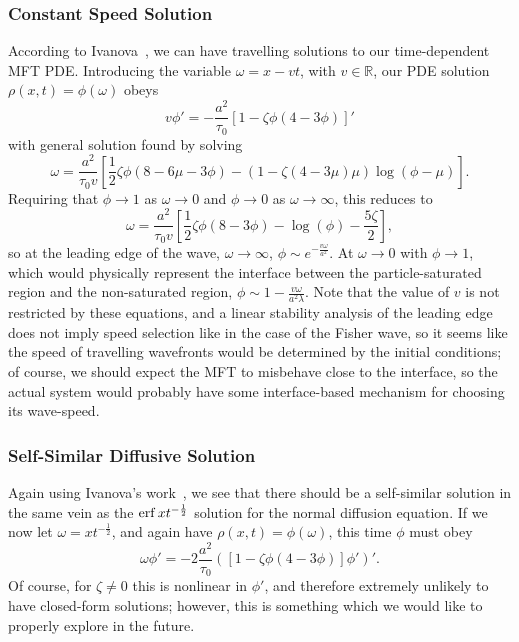 \subsubsection{Constant Speed Solution}
According to Ivanova~\cite{ivanova2007}, we can have travelling solutions to our time-dependent MFT PDE. Introducing the variable $\omega = x - vt$, with $v\in \mathbb{R}$, our PDE solution $\rho(x, t) = \phi(\omega)$ obeys
\begin{equation}
 v \phi ' = -\frac{a^2}{\tau_0} \left[ 1-\zeta \phi \left(4-3\phi\right) \right] '
\end{equation}
with general solution found by solving
\begin{equation}
 \omega = \frac{a^2}{\tau_0 v} \left[ \frac{1}{2} \zeta \phi \left(8-6\mu-3\phi\right) - \left(1-\zeta\left(4-3\mu\right)\mu\right) \log{\left(\phi-\mu\right)} \right].
\end{equation}
Requiring that $\phi \rightarrow  1$ as $\omega \rightarrow 0$ and $\phi \rightarrow 0$ as $\omega \rightarrow \infty$, this reduces to
\begin{equation}
 \omega = \frac{a^2}{\tau_0 v} \left[ \frac{1}{2} \zeta \phi \left(8-3\phi\right) - \log{\left(\phi\right)} - \frac{5 \zeta}{2} \right],
\end{equation}
so at the leading edge of the wave, $\omega \rightarrow \infty$, $\phi \sim e^{-\frac{v \omega}{a^2}} $. At $\omega \rightarrow 0$ with $\phi \rightarrow 1$, which would physically represent the interface between the particle-saturated
region and the non-saturated region, $\phi \sim 1 - \frac{v \omega}{a^2 \lambda}$. Note that the value of $v$ is not restricted by these equations, and a linear stability analysis of the leading edge does not imply speed selection like in
the case of the Fisher wave\cite{sherratt1998transition}, so it seems like the speed of travelling wavefronts would be determined by the initial conditions; of course, we should expect the MFT to misbehave close to the interface,
so the actual system would probably have some interface-based mechanism for choosing its wave-speed.
\subsubsection{Self-Similar Diffusive Solution}
Again using Ivanova's work~\cite{ivanova2007}, we see that there should be a self-similar solution in the same vein as the $\operatorname{erf}{x t^{-\frac{1}{2}}}$ solution for the normal diffusion equation. If we now let $\omega = x t^{-\frac{1}{2}}$, and
again have $\rho(x, t) = \phi(\omega)$, this time $\phi$ must obey
\begin{equation}
 \omega \phi ' = -2\frac{a^2}{\tau_0}\left( \left[ 1-\zeta \phi (4 - 3 \phi) \right] \phi ' \right) ' .
\end{equation}
Of course, for $\zeta \neq 0$ this is nonlinear in $\phi '$, and therefore extremely unlikely to have closed-form solutions; however, this is something which we would like to properly explore in the future.